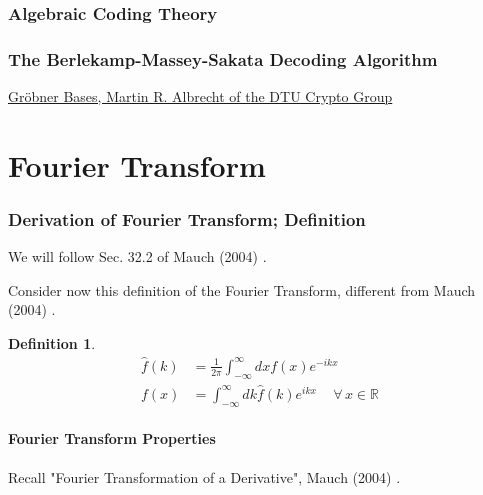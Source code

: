 \documentclass[10pt]{amsart}
\newtheorem{definition}{Definition}
\begin{document}
\begin{multicols*}{2}
\section{Algebraic Coding Theory}


\section{The Berlekamp-Massey-Sakata Decoding Algorithm}





\href{https://martinralbrecht.files.wordpress.com/2010/07/20131022_buchberger_dtu.pdf}{Gr\"{o}bner Bases, Martin R. Albrecht of the DTU Crypto Group}

\part{Fourier Transform}

\section{Derivation of Fourier Transform; Definition}

We will follow Sec. 32.2 of Mauch (2004) \cite{Mauc2004}.

Consider now this definition of the Fourier Transform, different from Mauch (2004) \cite{Mauc2004}.

\begin{definition}
\begin{equation}
\begin{aligned}
\widehat{f}(k) &= \frac{1}{2\pi} \int_{-\infty}^{\infty} dx f(x) e^{-ikx} \\
f(x) & = \int_{-\infty}^{\infty} dk \widehat{f}(k) e^{ikx} \quad \, \forall \, x \in \mathbb{R}
\end{aligned}
\end{equation}
\end{definition}

\subsection{Fourier Transform Properties}

Recall "Fourier Transformation of a Derivative", Mauch (2004) \cite{Mauc2004}.


\end{multicols*}
\end{document}

